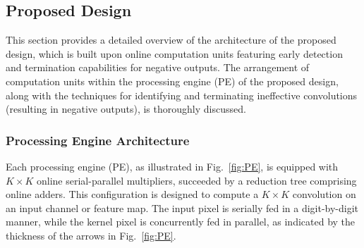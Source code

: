 \documentclass[conference]{IEEEtran}
\begin{document}
\subsection{Proposed Design} %
This section provides a detailed overview of the architecture of the proposed design, which is built upon online computation units featuring early detection and termination capabilities for negative outputs. The arrangement of computation units within the processing engine (PE) of the proposed design, along with the techniques for identifying and terminating ineffective convolutions (resulting in negative outputs), is thoroughly discussed.

\subsubsection{Processing Engine Architecture}

Each processing engine (PE), as illustrated in Fig.~\ref{fig:PE}, is equipped with $K \times K$ online serial-parallel multipliers, succeeded by a reduction tree comprising online adders. This configuration is designed to compute a $K \times K$ convolution on an input channel or feature map. The input pixel is serially fed in a digit-by-digit manner, while the kernel pixel is concurrently fed in parallel, as indicated by the thickness of the arrows in Fig.~\ref{fig:PE}.
\end{document}
